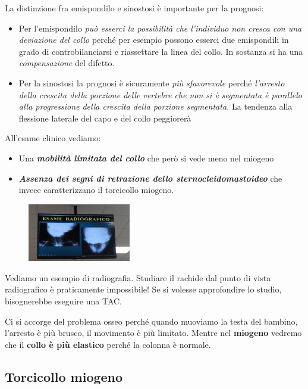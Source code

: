 La distinzione fra emispondilo e sinostosi è importante per la prognosi:

\begin{itemize}
\item
  Per l'emispondilo \emph{può esserci la possibilità che l'individuo non cresca con una deviazione del collo} perché per esempio possono esserci due emispondili in grado di controbilanciarsi e riassettare la linea del collo. In sostanza si ha una \emph{compensazione} del difetto.
\item
  Per la sinostosi la prognosi è sicuramente \emph{più sfavorevole} perché \emph{l'arresto della crescita della porzione delle vertebre che non si è segmentata è parallelo alla progressione della crescita della porzione segmentata.} La tendenza alla flessione laterale del capo e del collo peggiorerà
\end{itemize}

All'esame clinico vediamo:

\begin{itemize}
\item
  Una \textbf{\emph{mobilità limitata del collo}} che però si vede meno nel miogeno
\item
  \textbf{\emph{Assenza dei segni di retrazione dello sternocleidomastoideo}} che invece caratterizzano il torcicollo miogeno.
\end{itemize}

\begin{figure}[!ht]
\centering
\includegraphics[width=0.4\textwidth]{013/image20.jpeg}
\end{figure}

Vediamo un esempio di radiografia. Studiare il rachide dal punto di vista radiografico è praticamente impossibile! Se si volesse approfondire lo studio, bisognerebbe eseguire una TAC.

Ci si accorge del problema osseo perché quando muoviamo la testa del bambino, l'arresto è più brusco, il movimento è più limitato. Mentre nel \textbf{miogeno} vedremo che il \textbf{collo è più elastico} perché la colonna è normale.

\subsection{Torcicollo miogeno}

